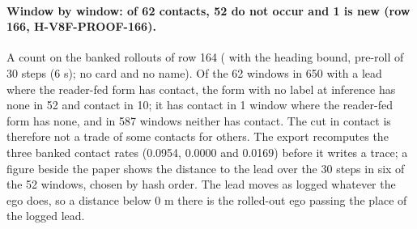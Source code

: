 \paragraph{Window by window: of 62 contacts, 52 do not occur and 1 is new (row 166, H-V8F-PROOF-166).} A count on the banked rollouts of row 164 ( with the heading bound, pre-roll of 30 steps (6 s); no card and no name). Of the 62 windows in 650 with a lead where the reader-fed form has contact, the form with no label at inference has none in 52 and contact in 10; it has contact in 1 window where the reader-fed form has none, and in 587 windows neither has contact. The cut in contact is therefore not a trade of some contacts for others. The export recomputes the three banked contact rates (0.0954, 0.0000 and 0.0169) before it writes a trace; a figure beside the paper shows the distance to the lead over the 30 steps in six of the 52 windows, chosen by hash order. The lead moves as logged whatever the ego does, so a distance below 0 m there is the rolled-out ego passing the place of the logged lead.
